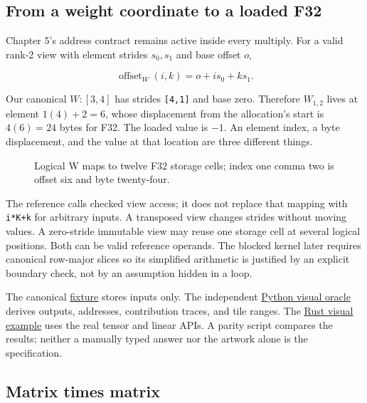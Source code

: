 \documentclass[
  10pt,
]{article}
\begin{document}
\subsection{From a weight coordinate to a loaded
F32}\label{from-a-weight-coordinate-to-a-loaded-f32}

Chapter 5's address contract remains active inside every multiply. For a
valid rank-2 view with element strides \(s_0,s_1\) and base offset
\(o\),

\[
\operatorname{offset}_W(i,k)=o+i s_0+k s_1.
\]

Our canonical \(W:[3,4]\) has strides \texttt{{[}4,1{]}} and base zero.
Therefore \(W_{1,2}\) lives at element \(1(4)+2=6\), whose displacement
from the allocation's start is \(4(6)=24\) bytes for F32. The loaded
value is \(-1\). An element index, a byte displacement, and the value at
that location are three different things.

\begin{figure}[H]\centering\resizebox{\linewidth}{!}{}\caption{Logical W maps to twelve F32 storage cells; index one comma two is offset six and byte twenty-four.}\end{figure}

The reference calls checked view access; it does not replace that
mapping with \texttt{i*K+k} for arbitrary inputs. A transposed view
changes strides without moving values. A zero-stride immutable view may
reuse one storage cell at several logical positions. Both can be valid
reference operands. The blocked kernel later requires canonical
row-major slices so its simplified arithmetic is justified by an
explicit boundary check, not by an assumption hidden in a loop.

The canonical
\href{https://github.com/hermonai/inside-the-llm-engine/blob/astra-visual-rewrite/code/reference/fixtures/chapter06-visual.json}{fixture}
stores inputs only. The independent
\href{https://github.com/hermonai/inside-the-llm-engine/blob/astra-visual-rewrite/code/reference/python/chapter06_visual_oracle.py}{Python
visual oracle} derives outputs, addresses, contribution traces, and tile
ranges. The
\href{https://github.com/hermonai/inside-the-llm-engine/blob/astra-visual-rewrite/code/mini-engine/crates/engine0/examples/chapter06_visual_trace.rs}{Rust
visual example} uses the real tensor and linear APIs. A parity script
compares the results; neither a manually typed answer nor the artwork
alone is the specification.

\subsection{Matrix times matrix}\label{matrix-times-matrix}
\end{document}
